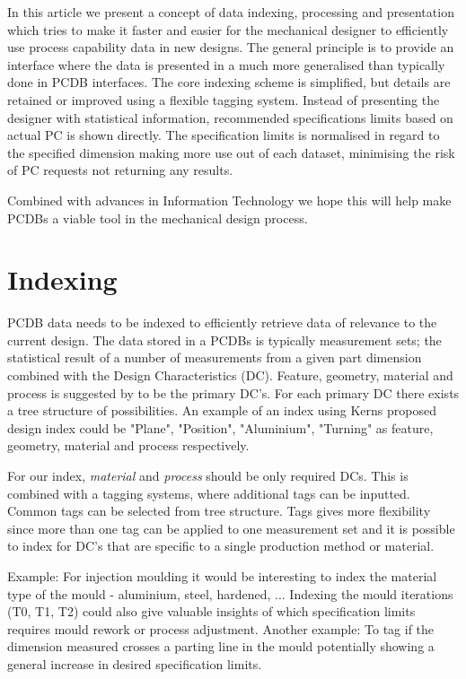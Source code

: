 \documentclass[aip,amsmath, reprint, author-year]{revtex4-1}
\begin{document}
In this article we present a concept of data indexing, processing and presentation which tries to make it faster and easier for the mechanical designer to efficiently use process capability data in new designs. 
The general principle is to provide an interface where the data is presented in a much more generalised than typically done in PCDB interfaces. 
The core indexing scheme is simplified, but details are retained or improved using a flexible tagging system. 
Instead of presenting the designer with statistical information, recommended specifications limits based on actual PC is shown directly. 
The specification limits is normalised in regard to the specified dimension making more use out of each dataset, minimising the risk of PC requests not returning any results. 

Combined with advances in Information Technology we hope this will help make PCDBs a viable tool in the mechanical design process. 

\section{Indexing}
PCDB data needs to be indexed to efficiently retrieve data of relevance to the current design. The data stored in a PCDBs is typically measurement sets; the statistical result of a number of measurements from a given part dimension combined with the Design Characteristics (DC). Feature, geometry, material and process is suggested by \cite{kern2003forecasting} to be the primary DC's. For each primary DC there exists a tree structure of possibilities. An example of an index using Kerns proposed design index could be "Plane", "Position", "Aluminium", "Turning" as feature, geometry, material and process respectively. 

For our index,  \emph{material} and \emph{process} should be only required DCs. This is combined with a tagging systems, where additional tags can be inputted. Common tags can be selected from tree structure. 
Tags gives more flexibility since more than one tag can be applied to one measurement set and it is possible to index for DC's that are specific to a single production method or material. 

Example: For injection moulding it would be interesting to index the material type of the mould - aluminium, steel, hardened, ... Indexing the mould iterations (T0, T1, T2) could also give valuable insights of which specification limits requires mould rework or process adjustment. Another example: To tag if the dimension measured crosses a parting line in the mould potentially showing a general increase in desired specification limits.
\end{document}
